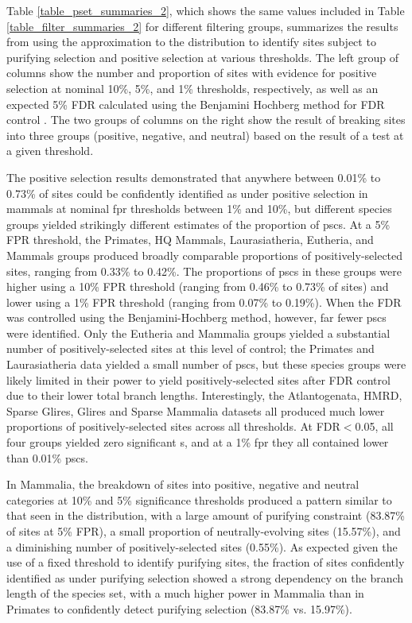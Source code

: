 Table \ref{table_pset_summaries_2}, which shows the same values
included in Table \ref{table_filter_summaries_2} for different
filtering groups, summarizes the results from using the \chisq
approximation to the \slrt distribution to identify sites subject to
purifying selection and positive selection at various \fpr
thresholds. The left group of columns show the number and proportion
of sites with evidence for positive selection at nominal 10\%, 5\%,
and 1\% \fpr thresholds, respectively, as well as an expected 5\% FDR
calculated using the Benjamini Hochberg method for FDR control
\citep{Benjamini1995}. The two groups of columns on the right show the
result of breaking sites into three groups (positive, negative, and
neutral) based on the result of a \chisq test at a given \fpr
threshold.

The positive selection results demonstrated that anywhere between
0.01\% to 0.73\% of sites could be confidently identified as under
positive selection in mammals at nominal \ac{fpr} thresholds between
1\% and 10\%, but different species groups yielded strikingly
different estimates of the proportion of \acp{psc}. At a 5\% FPR
threshold, the Primates, HQ Mammals, Laurasiatheria, Eutheria, and
Mammals groups produced broadly comparable proportions of
positively-selected sites, ranging from 0.33\% to 0.42\%. The
proportions of \acp{psc} in these groups were higher using a 10\% FPR
threshold (ranging from 0.46\% to 0.73\% of sites) and lower using a
1\% FPR threshold (ranging from 0.07\% to 0.19\%). When the FDR was
controlled using the Benjamini-Hochberg method, however, far fewer
\acp{psc} were identified. Only the Eutheria and Mammalia groups
yielded a substantial number of positively-selected sites at this
level of control; the Primates and Laurasiatheria data yielded a small
number of \acp{psc}, but these species groups were likely limited in
their power to yield positively-selected sites after FDR control due
to their lower total branch lengths. Interestingly, the Atlantogenata,
HMRD, Sparse Glires, Glires and Sparse Mammalia datasets all produced
much lower proportions of positively-selected sites across all \fpr
thresholds. At FDR$<$0.05, all four groups yielded zero significant
\psc{}s, and at a 1\% \ac{fpr} they all contained lower than 0.01\%
\acp{psc}.

In Mammalia, the breakdown of sites into positive, negative and
neutral categories at 10\% and 5\% significance thresholds produced a
pattern similar to that seen in the \omgml distribution, with a large
amount of purifying constraint (83.87\% of sites at 5\% FPR), a small
proportion of neutrally-evolving sites (15.57\%), and a diminishing
number of positively-selected sites (0.55\%). As expected given the
use of a fixed \slrt threshold to identify purifying sites, the
fraction of sites confidently identified as under purifying selection
showed a strong dependency on the branch length of the species set,
with a much higher power in Mammalia than in Primates to confidently
detect purifying selection (83.87\% vs. 15.97\%).

